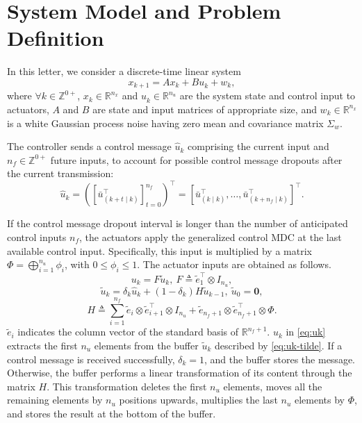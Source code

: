 \documentclass[journal,twoside,web]{ieeecolor}
\begin{document}
\section{System Model and Problem Definition}\label{sec:model}
In this letter, we consider a discrete-time linear system %
\begin{equation}\label{eq:state}
        x_{k+1} = A x_{k} + B u_{k}^{} + w_{k},
\end{equation}
where $\forall k \!\in\! \mathbb{Z}^{0+}$, $x_k\!\in\!\mathbb{R}^{n_x}$ and $u_k^{}\!\in\!\mathbb{R}^{n_u}$ are the system state and control input to actuators, $A$ and $B$ are state and input matrices of appropriate size, and $w_k\!\in\!\mathbb{R}^{n_x}$ is a white Gaussian process noise having zero mean and covariance matrix $\Sigma_w$.

The controller sends a control message $\hat{u}_k$ comprising the current input and $n_{f}\in\mathbb{Z}^{0+}$ future inputs, to account for possible control message dropouts after the current transmission: 
\begin{equation}\label{eq:control-message}
    \hat{u}_k =
    \left(\left[\bar{u}_{(k+t\mid k)}^{\top}\right]_{t=0}^{n_f}\right)^{\top} = 
    \left[\bar{u}_{(k\mid k)}^{\top},\dots,\bar{u}_{(k+n_f\mid k)}^{\top}\right]^{\top}.
\end{equation}

If the control message dropout interval is longer than the number of anticipated control inputs $n_f$, the actuators apply the generalized control MDC at the last available control input.  Specifically, this input is multiplied by a matrix $\mathit{\Phi}=\bigoplus_{i=1}^{n_u} \phi_i$, with $0 \leq \phi_i \leq 1$. 
The actuator inputs are obtained as follows.
\begin{equation}\label{eq:uk}
    u_k = F \tilde{u}_k,~F \triangleq \tilde{e}_{1}^{\top} \otimes I_{n_u},
\end{equation}
\begin{equation}\label{eq:uk-tilde}
    \tilde{u}_k = \delta_k \hat{u}_k + \left(1-\delta_k\right) H \tilde{u}_{k-1},~\tilde{u}_0 = \mathbf{0},
\end{equation}
\begin{equation}\label{eq:H}
    H \triangleq \sum_{i=1}^{n_f} \tilde{e}_{i} \otimes \tilde{e}_{i+1}^{\top} \otimes I_{n_u} + 
    \tilde{e}_{n_f+1} \otimes \tilde{e}_{n_f+1}^{\top} \otimes \mathit{\Phi}.
\end{equation}
$\tilde{e}_{i}$ indicates the column vector of the standard basis of $\mathbb{R}^{n_f+1}$.
$u_k$ in \eqref{eq:uk} extracts the first $n_u$ elements from the buffer $\tilde{u}_k$ described by \eqref{eq:uk-tilde}.
If a control message is received successfully, $\delta_k = 1$, and the buffer stores the message. Otherwise, the buffer performs a linear transformation of its content through the matrix $H$. This transformation deletes the first $n_u$ elements,  moves all the remaining elements by $n_u$ positions upwards, multiplies the last $n_u$ elements by $\mathit{\Phi}$, and stores the result at the bottom of the buffer.
\end{document}
